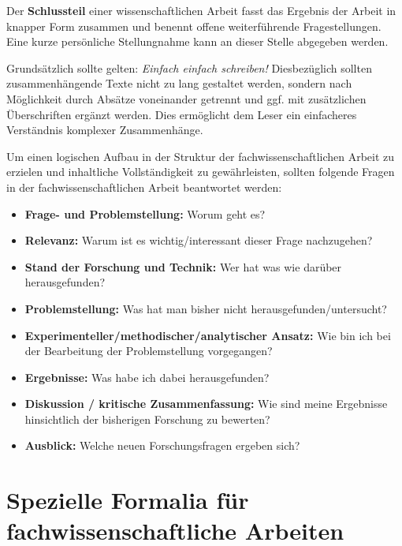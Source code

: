 Der \textbf{Schlussteil} einer wissenschaftlichen Arbeit fasst das Ergebnis der Arbeit in knapper Form zusammen und benennt offene weiterführende Fragestellungen. Eine kurze persönliche Stellungnahme kann an dieser Stelle abgegeben werden.

Grundsätzlich sollte gelten: \emph{Einfach einfach schreiben!} Diesbezüglich sollten zusammenhängende Texte nicht zu lang gestaltet werden, sondern nach Möglichkeit durch Absätze voneinander getrennt und ggf. mit zusätzlichen Überschriften ergänzt werden. Dies ermöglicht dem Leser ein einfacheres Verständnis komplexer Zusammenhänge.

Um einen logischen Aufbau in der Struktur der fachwissenschaftlichen Arbeit zu erzielen und inhaltliche Vollständigkeit zu gewährleisten, sollten folgende Fragen in der fachwissenschaftlichen Arbeit beantwortet werden:
\begin{itemize}
	\item \textbf{Frage- und Problemstellung:} Worum geht es?
	\item \textbf{Relevanz:} Warum ist es wichtig/interessant dieser Frage nachzugehen?
	\item \textbf{Stand der Forschung und Technik:} Wer hat was wie darüber herausgefunden?
	\item \textbf{Problemstellung:} Was hat man bisher nicht herausgefunden/untersucht?
	\item \textbf{Experimenteller/methodischer/analytischer Ansatz:} Wie bin ich bei der Bearbeitung der Problemstellung vorgegangen?
	\item \textbf{Ergebnisse:} Was habe ich dabei herausgefunden?
	\item \textbf{Diskussion / kritische Zusammenfassung:} Wie sind meine Ergebnisse hinsichtlich der bisherigen Forschung zu bewerten?
	\item \textbf{Ausblick:} Welche neuen Forschungsfragen ergeben sich?
\end{itemize}

\section{Spezielle Formalia für fachwissenschaftliche Arbeiten}
\label{sec:Spezielle Formalia für fachwissenschaftliche Arbeiten}

